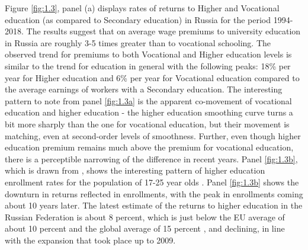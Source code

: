\documentclass[alpha-refs]{wiley-article-01g}
\begin{document}
Figure \ref{fig:1.3}, panel (a) displays rates of returns to Higher and Vocational education (as compared to Secondary education) in Russia for the period 1994-2018. The results suggest that on average wage premiums to university education in Russia are roughly 3-5 times greater than to vocational schooling. The observed trend for premiums to both Vocational and Higher education levels is similar to the trend for education in general with the following peaks: 18\% per year for Higher education and 6\% per year for Vocational education compared to the average earnings of workers with a Secondary education. The interesting pattern to note from panel \ref{fig:1.3a} is the apparent co-movement of vocational education and higher education - the higher education smoothing curve turns a bit more sharply than the one for vocational education, but their movement is matching, even at second-order levels of smoothness. Further, even though higher education premium remains much above the premium for vocational education, there is a perceptible narrowing of the difference in recent years. Panel \ref{fig:1.3b}, which is drawn from \cite{Telezhkina2019}, shows the interesting pattern of higher education enrollment rates for the population of 17-25 year olds . Panel \ref{fig:1.3b} shows the downturn in returns reflected in enrollments, with the peak in enrollments coming about 10 years later. The latest estimate of the returns to higher education in the Russian Federation is about 8 percent, which is just below the EU average of about 10 percent and the global average of 15 percent \parencite{Psacharopoulos_Patrinos2018}, and declining, in line with the expansion that took place up to 2009. 
\end{document}
